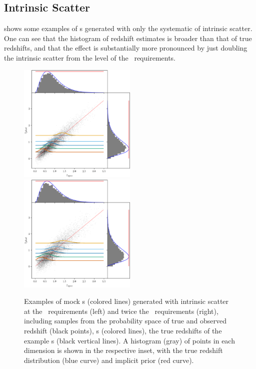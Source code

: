 \subsection{Intrinsic Scatter}

 shows some examples of \pzpdf s generated with only the systematic of intrinsic scatter.
One can see that the histogram of redshift estimates is broader than that of true redshifts, and that the effect is substantially more pronounced by just doubling the intrinsic scatter from the level of the \lsst\ requirements.

\begin{figure}
	\includegraphics[width=0.5\textwidth]{figures/chippr/samplepzs_scatter1.png}
	\includegraphics[width=0.5\textwidth]{figures/chippr/samplepzs_scatter2.png}
	\caption{
		Examples of mock \pzpdf s (colored lines) generated with intrinsic scatter at the \lsst\ requirements (left) and twice the \lsst\ requirements (right), including samples from the probability space of true and observed redshift (black points), \pzpdf s (colored lines), the true redshifts of the example \pzpdf s (black vertical lines).
		A histogram (gray) of points in each dimension is shown in the respective inset, with the true redshift distribution (blue curve) and implicit prior (red curve).
	}
\end{figure}

